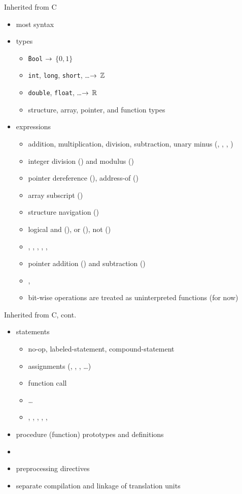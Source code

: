 \documentclass[t]{beamer}
\begin{document}
\begin{frame}{Inherited from C}
  \begin{itemize}
  \item most syntax
  \item types
    \begin{itemize}
    \item \texttt{{\U}Bool} $\rightarrow$ $\{0,1\}$
    \item \texttt{int}, \texttt{long}, \texttt{short}, \ldots $\rightarrow$ $\mathbb{Z}$
    \item \texttt{double}, \texttt{float}, \ldots $\rightarrow$ $\mathbb{R}$
    \item structure, array, pointer, and function types
    \end{itemize}
  \item expressions
    \begin{itemize}
    \item addition, multiplication, division, subtraction, unary minus (\code{+}, 
      \code{*}, \code{/}, \code{-})
    \item integer division (\code{/}) and modulus (\code{\%})
    \item pointer dereference (\code{*}), address-of (\code{\&})
    \item array subscript (\code{[...]})
    \item structure navigation ()
    \item logical and (\code{\&\&}), or (\code{||}), not (\code{!})
    \item \code{==}, \code{!=}, \code{<}, \code{>}, \code{<=}, \code{>=}
    \item pointer addition (\code{+}) and subtraction (\code{-})
    \item \code{++}, \code{--}
    \item bit-wise operations are treated as uninterpreted functions (for now)
    \end{itemize}
  \end{itemize}
\end{frame}

\begin{frame}{Inherited from C, cont.}
  \begin{itemize}
  \item statements
    \begin{itemize}
    \item no-op, labeled-statement, compound-statement
    \item assignments (\code{=}, \code{+=}, \code{-=}, \ldots)
    \item function call
    \item {}\ldots{}
    \item {}, , , ,
      , 
    \end{itemize}
  \item procedure (function) prototypes and definitions
  \item {}
  \item preprocessing directives
  \item separate compilation and linkage of translation units
  \end{itemize}
\end{frame}
\end{document}
